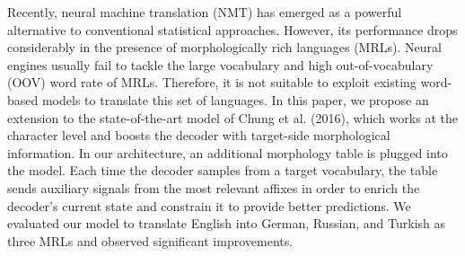 Recently, neural machine translation (NMT) has emerged as a powerful alternative to conventional statistical approaches. However, its performance drops considerably in the presence of morphologically rich languages (MRLs). Neural engines usually fail to tackle the large vocabulary and high out-of-vocabulary (OOV) word rate of MRLs. Therefore, it is not suitable to exploit existing word-based models to translate this set of languages. In this paper, we propose an extension to the state-of-the-art model of Chung et al. (2016), which works at the character level and boosts the decoder with target-side morphological information. In our architecture, an additional morphology table is plugged into the model. Each time the decoder samples from a target vocabulary, the table sends auxiliary signals from the most relevant affixes in order to enrich the decoder's current state and constrain it to provide better predictions. We evaluated our model to translate English into German, Russian, and Turkish as three MRLs and observed significant improvements.
